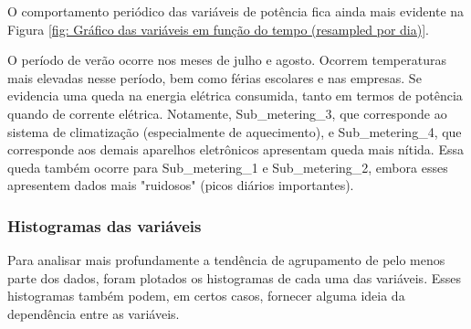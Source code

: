 O comportamento periódico das variáveis de potência fica ainda mais evidente na Figura \ref{fig: Gráfico das variáveis em função do tempo (resampled por dia)}.

O período de verão ocorre nos meses de julho e agosto. Ocorrem temperaturas mais elevadas nesse período, bem como férias escolares e nas empresas. Se evidencia uma queda na energia elétrica consumida, tanto em termos de potência quando de corrente elétrica. 
Notamente, Sub\_metering\_3, que corresponde ao sistema de climatização (especialmente de aquecimento), e Sub\_metering\_4, que corresponde aos demais aparelhos eletrônicos apresentam queda mais nítida. Essa queda também ocorre para Sub\_metering\_1 e Sub\_metering\_2, embora esses apresentem dados mais "ruidosos" (picos diários importantes).

\subsubsection{Histogramas das variáveis}

Para analisar mais profundamente a tendência de agrupamento de pelo menos parte dos dados, foram plotados os histogramas de cada uma das variáveis. Esses histogramas também podem, em certos casos, fornecer alguma ideia da dependência entre as variáveis. 

